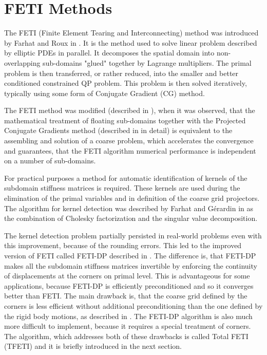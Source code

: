 \section{FETI Methods}
The FETI (Finite Element Tearing and Interconnecting) method was introduced by Farhat and Roux 
in \cite{feti1}. It is the method used to solve linear problem described by elliptic PDEs in 
parallel. It decomposes the spatial domain into non-overlapping sub-domains "glued" together 
by Lagrange multipliers. The primal problem is then transferred, or rather reduced, into the 
smaller and better conditioned constrained QP problem. This problem is then solved iteratively,
typically using some form of Conjugate Gradient (CG) method.


The FETI method was modified (described in \cite{feti1optimal}), when it was observed, that the mathematical 
treatment of floating sub-domains together with the Projected Conjugate Gradients method 
(described in \cite{vriha2016massively} in detail) is equivalent to the assembling and solution 
of a coarse problem, which accelerates the convergence and guarantees, that the FETI algorithm 
numerical  performance is independent on a number of sub-domains.

For practical purposes a method for automatic identification of kernels of the
subdomain stiffness matrices is required. These kernels are used during the elimination of the primal 
variables and in definition of the coarse grid projectors. The algorithm for kernel detection was
described by Farhat and Gérardin in \cite{feti1optimal2} as the combination of Cholesky 
factorization and the singular value decomposition.

The kernel detection problem partially persisted in real-world problems even with this 
improvement, because of the rounding errors. This led to the improved version of FETI called 
FETI-DP described in \cite{fetidp}. The difference is, that FETI-DP makes all the subdomain stiffness
matrices invertible by enforcing the continuity of displacements at the corners 
on primal level. This is advantageous for some applications, because FETI-DP is efficiently 
preconditioned and so it converges better than FETI. The main drawback is, that the coarse grid
defined by the corners is less efficient without additional preconditioning than the one defined
by the rigid body motions, as described in \cite{fetidpDostal}. The FETI-DP algorithm is also 
much more difficult to implement, because it requires a special treatment of corners. The algorithm, which addresses both of these drawbacks is called Total FETI (TFETI) and it is briefly introduced in the next section. %


